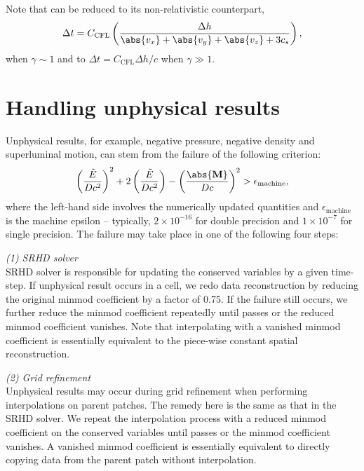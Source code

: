 Note that  can be reduced to its non-relativistic counterpart,
\begin{equation}
    \Delta t=C_{\text{CFL}}\left(\frac{\Delta h}{\abs{v_x}+\abs{v_y}+\abs{v_z}+3c_s}\right),
\end{equation}
when $\gamma\sim 1$ and to $\Delta t = C_{\text{CFL}}\Delta h/c$ when $\gamma \gg 1$.


\section{Handling unphysical results}
Unphysical results, for example, negative pressure, negative density and superluminal motion, can stem from the failure of the following criterion:
\begin{equation}
\left(\frac{\tilde{E}}{Dc^2}\right)^2+2\left(\frac{\tilde{E}}{Dc^2}\right)-\left(\frac{\abs{\mathbf{M}}}{Dc}\right)^2>\epsilon_{\text{machine}},
\label{Unphysical result}
\end{equation}
where the left-hand side involves the numerically updated quantities and $\epsilon_{\text{machine}}$ is the machine epsilon -- typically, $2\times10^{-16}$ for double precision and $1\times 10^{-7}$ for single precision. The failure may take place in one of the following four steps:

\emph{(1) SRHD solver}\\
SRHD solver is responsible for updating the conserved variables by a given time-step. If unphysical result occurs in a cell, we redo data reconstruction by reducing the original minmod coefficient by a factor of 0.75. If the failure still occurs, we further reduce the minmod coefficient repeatedly until  passes or the reduced minmod coefficient vanishes. Note that interpolating with a vanished minmod coefficient is essentially equivalent to the piece-wise constant spatial reconstruction.

\emph{(2) Grid refinement}\\
Unphysical results may occur during grid refinement when performing interpolations on parent patches. The remedy here is the same as that in the SRHD solver. We repeat the interpolation process with a reduced minmod coefficient on the conserved variables until  passes or the minmod coefficient vanishes. A vanished minmod coefficient is essentially equivalent to directly copying data from the parent patch without interpolation.

